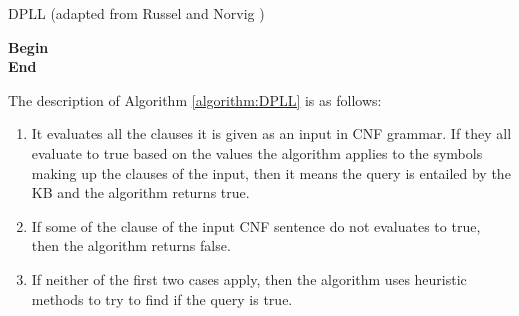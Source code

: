 \vspace{0.5cm}
\begin{algorithm}[H]
\label{algorithm:DPLL}
\caption{\textsc{DPLL} (adapted from Russel and Norvig \citep{russell2016artificial})}
\SetAlgoLined
\DontPrintSemicolon
{}
\textbf{Begin} \\
\Indm 
\textbf{End}   \\
\end{algorithm}
\vspace{0.5cm}
  
  
  
The description of Algorithm \ref{algorithm:DPLL} is as follows:
\begin{enumerate}
\item It evaluates all the clauses it is given as an input in CNF grammar. If they all evaluate to true based on the values the algorithm applies to the symbols making up the clauses of the input, then it means the query is entailed by the KB and the algorithm returns true.
\item If some of the clause of the input CNF sentence do not evaluates to true, then the algorithm returns false.
\item If neither of the first two cases apply, then the algorithm uses heuristic methods to try to find if the query is true.
\end{enumerate}

